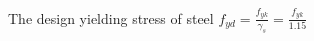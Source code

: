 \begin{minipage}{3cm}
  The design yielding stress of steel
  \(f_{yd} = \frac{f_{yk}}{\gamma_s} = \frac{f_{yk}}{1.15}\)
\end{minipage}